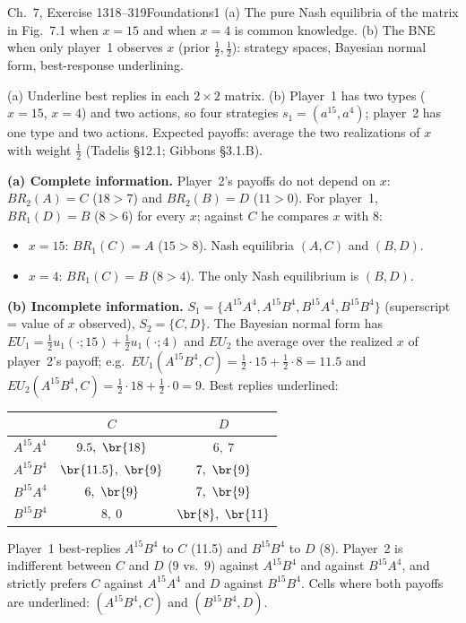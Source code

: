 \begin{exsol}{\MG{} Ch.~7, Exercise 1}{318--319}{Foundations}{1}
\asked (a) The pure Nash equilibria of the matrix in Fig.~7.1 when $x=15$ and when $x=4$ is
common knowledge. (b) The BNE when only player~1 observes $x$ (prior $\tfrac12,\tfrac12$): strategy
spaces, Bayesian normal form, best-response underlining.

\method (a) Underline best replies in each $2\times 2$ matrix. (b) Player~1 has two types
($x=15$, $x=4$) and two actions, so four strategies $s_1=(a^{15},a^{4})$; player~2 has one type
and two actions. Expected payoffs: average the two realizations of $x$ with weight $\tfrac12$
(Tadelis \S12.1; Gibbons \S3.1.B).

\solution
\textbf{(a) Complete information.} Player~2's payoffs do not depend on $x$: $BR_2(A)=C$ ($18>7$)
and $BR_2(B)=D$ ($11>0$). For player~1, $BR_1(D)=B$ ($8>6$) for every $x$; against $C$ he
compares $x$ with $8$:
\begin{itemize}
  \item $x=15$: $BR_1(C)=A$ ($15>8$). Nash equilibria $(A,C)$ and $(B,D)$.
  \item $x=4$: $BR_1(C)=B$ ($8>4$). The only Nash equilibrium is $(B,D)$.
\end{itemize}

\textbf{(b) Incomplete information.} $S_1=\{A^{15}A^{4},A^{15}B^{4},B^{15}A^{4},B^{15}B^{4}\}$
(superscript = value of $x$ observed), $S_2=\{C,D\}$. The Bayesian normal form has
$EU_1=\tfrac12 u_1(\cdot;15)+\tfrac12 u_1(\cdot;4)$ and $EU_2$ the average over the realized
$x$ of player~2's payoff; e.g.\ $EU_1(A^{15}B^{4},C)=\tfrac12\cdot15+\tfrac12\cdot 8=11.5$ and
$EU_2(A^{15}B^{4},C)=\tfrac12\cdot 18+\tfrac12\cdot 0=9$. Best replies underlined:
\begin{center}
\begin{tabular}{l|cc}
 & $C$ & $D$\\\hline
$A^{15}A^{4}$ & $9.5,\ \br{18}$ & $6,\ 7$\\
$A^{15}B^{4}$ & $\br{11.5},\ \br{9}$ & $7,\ \br{9}$\\
$B^{15}A^{4}$ & $6,\ \br{9}$ & $7,\ \br{9}$\\
$B^{15}B^{4}$ & $8,\ 0$ & $\br{8},\ \br{11}$
\end{tabular}
\end{center}
Player~1 best-replies $A^{15}B^{4}$ to $C$ (11.5) and $B^{15}B^{4}$ to $D$ (8). Player~2 is
indifferent between $C$ and $D$ ($9$ vs.\ $9$) against $A^{15}B^{4}$ and against $B^{15}A^{4}$,
and strictly prefers $C$ against $A^{15}A^{4}$ and $D$ against $B^{15}B^{4}$. Cells where both
payoffs are underlined: $(A^{15}B^{4},C)$ and $(B^{15}B^{4},D)$.


\end{exsol}
